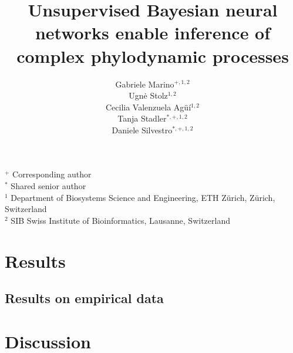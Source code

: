 \documentclass{article}
\title{Unsupervised Bayesian neural networks enable inference of complex phylodynamic processes}
\author{
    Gabriele Marino$^{+,1,2}$ \\
    Ugnė Stolz$^{1,2}$ \\
    Cecilia Valenzuela Agüí$^{1,2}$ \\
    Tanja Stadler$^{*,+,1,2}$ \\
    Daniele Silvestro$^{*,+,1,2}$
    }
\date{}
\begin{document}
\maketitle

\begin{center}
$^+$ Corresponding author \\
$^*$ Shared senior author \\
$^1$ Department of Biosystems Science and Engineering, ETH Zürich, Zürich, Switzerland \\
$^2$ SIB Swiss Institute of Bioinformatics, Lausanne, Switzerland
\end{center}

\linenumbers
{}





\section{Results}



\subsection{Results on empirical data}



\section{Discussion}













\end{document}
